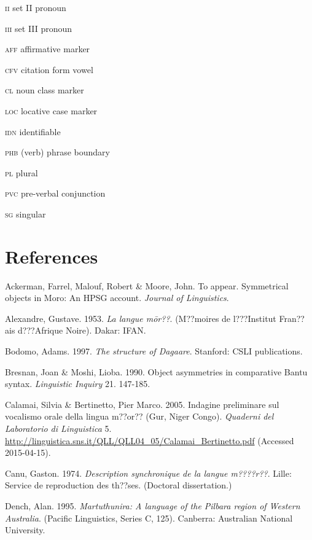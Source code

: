 \documentclass[output=paper]{langsci/langscibook}
\begin{document}
\textsc{ii  }set II pronoun



\textsc{iii  }set III pronoun



\textsc{aff}  affirmative marker



\textsc{cfv}  citation form vowel



\textsc{cl  }noun class marker



\textsc{loc  }locative case marker



\textsc{idn  }identifiable



\textsc{phb  }(verb) phrase boundary



\textsc{pl  }plural



\textsc{pvc  }pre-verbal conjunction



\textsc{sg  }singular


\section{References}

Ackerman, Farrel, Malouf, Robert \& Moore, John. To appear. Symmetrical objects in Moro: An HPSG account. \textit{Journal of Linguistics}. 

Alexandre, Gustave. 1953. \textit{La langue m\=or??}. (M??moires de l???Institut Fran??ais d???Afrique Noire). Dakar: IFAN. 

Bodomo, Adams. 1997. \textit{The structure of Dagaare}. Stanford: CSLI publications.

Bresnan, Joan \& Moshi, Lioba. 1990. Object asymmetries in comparative Bantu syntax. \textit{Linguistic Inquiry} 21. 147-185. 

Calamai, Silvia \& Bertinetto, Pier Marco. 2005. Indagine preliminare sul vocalismo orale della lingua m??or?? (Gur, Niger Congo). \textit{Quaderni del Laboratorio di Linguistica} 5. \url{http://linguistica.sns.it/QLL/QLL04_05/Calamai_Bertinetto.pdf} (Accessed 2015-04-15). 

Canu, Gaston. 1974. \textit{Description synchronique de la langue m????r??}. Lille: Service de reproduction des th??ses. (Doctoral dissertation.)

Dench, Alan. 1995. \textit{Martuthunira: A language of the Pilbara region of Western Australia}. (Pacific Linguistics, Series C, 125). Canberra: Australian National University.  
\end{document}
